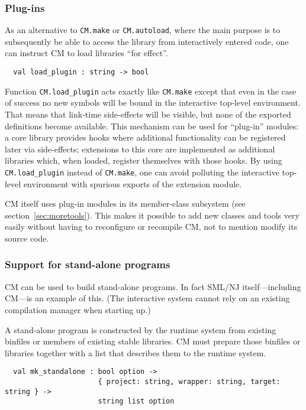 \documentclass[titlepage,letterpaper]{article}
\begin{document}
\subsubsection{Plug-ins}

As an alternative to {\tt CM.make} or {\tt CM.autoload}, where the
main purpose is to subsequently be able to access the library from
interactively entered code, one can instruct CM to load libraries
``for effect''.

\begin{verbatim}
  val load_plugin : string -> bool
\end{verbatim}

Function {\tt CM.load\_plugin} acts exactly like {\tt CM.make} except
that even in the case of success no new symbols will be bound in the
interactive top-level environment.  That means that link-time
side-effects will be visible, but none of the exported definitions
become available.  This mechanism can be used for ``plug-in'' modules:
a core library provides hooks where additional functionality can be
registered later via side-effects; extensions to this core are
implemented as additional libraries which, when loaded, register
themselves with those hooks.  By using {\tt CM.load\_plugin} instead
of {\tt CM.make}, one can avoid polluting the interactive top-level
environment with spurious exports of the extension module.

CM itself uses plug-in modules in its member-class subsystem (see
section~\ref{sec:moretools}).  This makes it possible to add new classes
and tools very easily without having to reconfigure or recompile CM,
not to mention modify its source code.

\subsubsection{Support for stand-alone programs}
\label{sec:mlbuild:support}

CM can be used to build stand-alone programs. In fact SML/NJ
itself---including CM---is an example of this.  (The interactive
system cannot rely on an existing compilation manager when starting
up.)

A stand-alone program is constructed by the runtime system from
existing binfiles or members of existing stable libraries.  CM must
prepare those binfiles or libraries together with a list that
describes them to the runtime system.

\begin{verbatim}
  val mk_standalone : bool option ->
                      { project: string, wrapper: string, target: string } ->
                      string list option
\end{verbatim}
\end{document}

